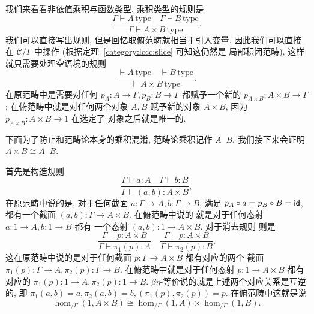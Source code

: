 我们来看看非依值乘积与函数类型. 乘积类型的规则是
\[\frac{\Gamma \vdash A\,\text{type}
\quad\Gamma \vdash B\,\text{type}}
{\Gamma \vdash A \times B\,\text{type}}.\]
我们可以直接写出规则, 但是回忆取俯范畴就相当于引入变量.
因此我们可以直接在 \(\mathcal C/\Gamma\) 中操作
(根据定理~\ref{category:lccc:slice} 可知这仍然是
局部积闭范畴), 这样就只需要处理空语境的规则
\[\frac{\vdash A\,\text{type}
\quad \vdash B\,\text{type}}
{\vdash A \times B\,\text{type}}.\]
在原范畴中是需要对任何
\(p_A : A \to \Gamma, p_B : B \to \Gamma\)
都赋予一个新的 \(p_{A \times B} : A\times B \to \Gamma\);
在俯范畴中就是对任何两个对象 \(A,B\) 赋予新的对象 \(A\times B\),
因为 \(p_{A\times B} : A\times B \to 1\) 在选定了
对象之后就是唯一的.

下面为了防止和范畴论本身的乘积混淆, 范畴论乘积记作
\(A \mathop{\hat\times} B\). 我们接下来会证明
\(A \times B \cong A \mathop{\hat\times} B\).

首先是构造规则
\[\frac{\Gamma \vdash a : A
\quad \Gamma \vdash b : B}
{\Gamma \vdash (a,b) : A \times B},\]
在原范畴中说的是, 对于任何截面 \(a : \Gamma \to A,
b : \Gamma \to B\), 满足 \(p_A \circ a =
p_B \circ B = \textnormal{\textsf{id}}\), 都有一个截面
\((a,b) : \Gamma \to A \times B\). 在俯范畴中说的
就是对于任何态射 \(a : 1 \to A, b : 1 \to B\) 都有
一个态射 \((a,b) : 1 \to A \times B\). 对于消去规则
则是
\[\frac{\Gamma \vdash p : A \times B}
{\Gamma \vdash \pi_1(p) : A}
\quad\frac{\Gamma \vdash p : A \times B}
{\Gamma \vdash \pi_2(p) : B}.\]
这在原范畴中说的是对于任何截面
\(p : \Gamma \to A \times B\) 都有对应的两个
截面 \(\pi_1(p) : \Gamma \to A, \pi_2(p) :
\Gamma \to B\). 在俯范畴中就是对于任何态射
\(p : 1 \to A \times B\) 都有对应的
\(\pi_1(p) : 1 \to A, \pi_2(p) : 1 \to B\).
\(\beta\eta\)-等价说的就是上述两个对应关系是互逆的,
即 \(\pi_1(a,b) = a, \pi_2(a,b) = b,
(\pi_1(p), \pi_2(p)) = p\). 在俯范畴中这就是说
\[\hom_{/\Gamma}(1, A\times B) \cong
\hom_{/\Gamma}(1, A) \times \hom_{/\Gamma}(1, B).\]

